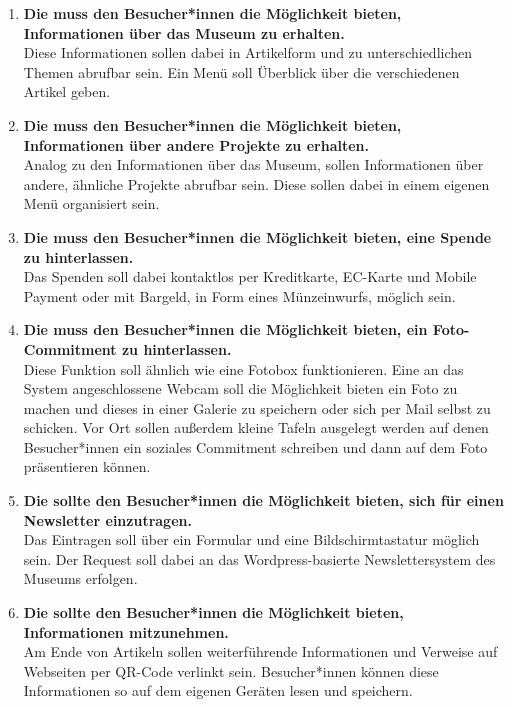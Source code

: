 \begin{enumerate}[label=\textbf{FA\arabic*}]
	\item\label{fa1} \textbf{Die \shst{} muss den Besucher*innen die Möglichkeit bieten, Informationen über das Museum zu erhalten.}\\
  Diese Informationen sollen dabei in Artikelform und zu unterschiedlichen Themen abrufbar sein. Ein Menü soll Überblick über 
  die verschiedenen Artikel geben. 
	\item\label{fa2} \textbf{Die \shst{} muss den Besucher*innen die Möglichkeit bieten, Informationen über andere Projekte zu erhalten.}\\
  Analog zu den Informationen über das Museum, sollen Informationen über andere, ähnliche Projekte abrufbar sein. Diese sollen dabei
  in einem eigenen Menü organisiert sein.
  \item\label{fa3} \textbf{Die \shst{} muss den Besucher*innen die Möglichkeit bieten, eine Spende zu hinterlassen.}\\
  Das Spenden soll dabei kontaktlos per Kreditkarte, EC-Karte und Mobile Payment oder mit Bargeld, in Form eines Münzeinwurfs, möglich sein.
  \item\label{fa4} \textbf{Die \shst{} muss den Besucher*innen die Möglichkeit bieten, ein Foto-Commitment zu hinterlassen.}\\
  Diese Funktion soll ähnlich wie eine Fotobox funktionieren. Eine an das System angeschlossene Webcam soll die Möglichkeit bieten ein Foto 
  zu machen und dieses in einer Galerie zu speichern oder sich per Mail selbst zu schicken. Vor Ort sollen außerdem kleine Tafeln ausgelegt werden
  auf denen Besucher*innen ein soziales Commitment schreiben und dann auf dem Foto präsentieren können. 
  \item\label{fa5} \textbf{Die \shst{} sollte den Besucher*innen die Möglichkeit bieten, sich für einen Newsletter einzutragen.}\\ %
  Das Eintragen soll über ein Formular und eine Bildschirmtastatur möglich sein. Der Request soll dabei an das Wordpress-basierte 
  Newslettersystem des Museums erfolgen. 
  \item\label{fa6} \textbf{Die \shst{} sollte den Besucher*innen die Möglichkeit bieten, Informationen mitzunehmen.}\\
  Am Ende von Artikeln sollen weiterführende Informationen und Verweise auf Webseiten per QR-Code verlinkt sein. Besucher*innen können diese 
  Informationen so auf dem eigenen Geräten lesen und speichern. 

\end{enumerate}
